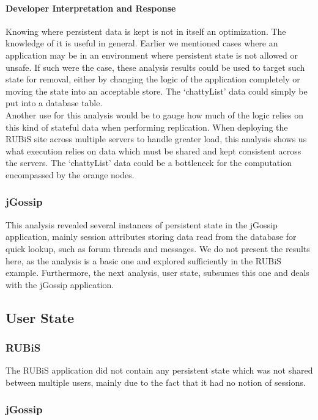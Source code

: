 \documentclass[msc,oneside]{ubcthesis}
\begin{document}
\paragraph{Developer Interpretation and Response}
Knowing where persistent data is kept is not in itself an optimization. The knowledge of it is useful in general. Earlier we mentioned cases where an application may be in an environment where persistent state is not allowed or unsafe. If such were the case, these analysis results could be used to target such state for removal, either by changing the logic of the application completely or moving the state into an acceptable store. The `chattyList' data could simply be put into a database table.\\

Another use for this analysis would be to gauge how much of the logic relies on this kind of stateful data when performing replication. When deploying the RUBiS site across multiple servers to handle greater load, this analysis shows us what execution relies on data which must be shared and kept consistent across the servers. The `chattyList' data could be a bottleneck for the computation encompassed by the orange nodes.

\subsubsection{jGossip} 

This analysis revealed several instances of persistent state in the jGossip application, mainly session attributes storing data read from the database for quick lookup, such as forum threads and messages. We do not present the results here, as the analysis is a basic one and explored sufficiently in the RUBiS example. Furthermore, the next analysis, user state, subsumes this one and deals with the jGossip application.

\subsection{User State}
\subsubsection{RUBiS}

The RUBiS application did not contain any persistent state which was not shared between multiple users, mainly due to the fact that it had no notion of sessions.

\subsubsection{jGossip}
\end{document}
